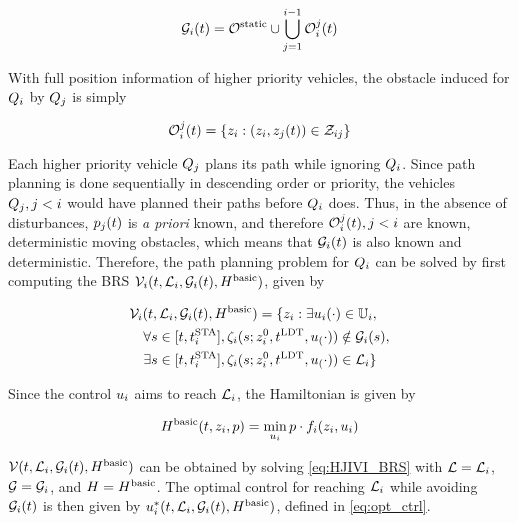 \begin{equation}
\label{eq:obsseti}
\obsset_i(t)  = \soset \cup \bigcup_{j=1}^{i-1} \ioset_i^j(t)
\end{equation}

With full position information of higher priority vehicles, the obstacle induced for $Q_{i}$ by $Q_{j}$ is simply

\begin{equation}
\label{eq:ioset}
\ioset_i^j(t) = \{\state_i: (\state_i, \state_j(t)) \in \dz_{ij}\}
\end{equation}

Each higher priority vehicle $Q_{j}$ plans its path while ignoring $Q_{i}$. Since path planning is done sequentially in descending order or priority, the vehicles $Q_{j}, j<i$ would have planned their paths before $Q_{i}$ does. Thus, in the absence of disturbances, $p_j(t)$ is \textit{a priori} known, and therefore $\mathcal{O}_i^j(t), j<i$ are known, deterministic moving obstacles, which means that $\mathcal{G}_i(t)$ is also known and deterministic. Therefore, the path planning problem for $Q_{i}$ can be solved by first computing the BRS $\mathcal{V}_i(t, \mathcal{L}_i, \mathcal{G}_i(t), H^\text{basic})$, given by

\begin{equation}
\label{eq:BRS_basic}
\begin{aligned}
&\brs_i(t, \targetset_i, \obsset_i(t), \basicham) = \{\state_i: \exists \ctrl_i(\cdot) \in \cfset_i, \\
&\quad\forall s \in [t, \sta_i], \traj_i(s; \state^0_i, \ldt, \ctrl_(\cdot)) \notin \obsset_i(s), \\
&\quad\exists s \in [t, \sta_i], \traj_i(s; \state^0_i, \ldt, \ctrl_(\cdot)) \in \targetset_i\}
\end{aligned}
\end{equation}

Since the control $u_i$ aims to reach $\mathcal{L}_i$, the Hamiltonian is given by

\begin{equation}
\label{eq:basicham}
\basicham(t, \state_i, p) = \min_{\ctrl_i} p \cdot \fdyn_i(\state_i, \ctrl_i)
\end{equation}

$\mathcal{V}(t, \mathcal{L}_i, \mathcal{G}_i(t), H^\text{basic})$ can be obtained by solving \eqref{eq:HJIVI_BRS} with $\mathcal{L} = \mathcal{L}_i$, $\mathcal{G} = \mathcal{G}_i$, and $H=H^\text{basic}$. The optimal control for reaching $\mathcal{L}_i$ while avoiding $\mathcal{G}_i(t)$ is then given by $u_i^*(t, \mathcal{L}_i, \mathcal{G}_i(t), H^\text{basic})$, defined in \eqref{eq:opt_ctrl}.

